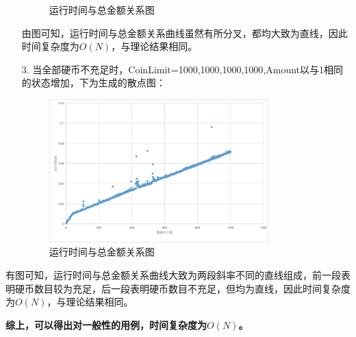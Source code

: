 \documentclass[UTF8]{ctexart}
\begin{document}
\begin{itemize}
\begin{figure}[H]
                \caption{运行时间与总金额关系图}
                \label{fig2}
                \end{figure}\par
由图可知，运行时间与总金额关系曲线虽然有所分叉，都均大致为直线，因此时间复杂度为$O(N)$，与理论结果相同。
    \item [3.]当全部硬币不充足时，CoinLimit={1000,1000,1000,1000},Amount以与1相同的状态增加，下为生成的散点图：
    \begin{figure}[H]
                \centering %
                \includegraphics[width=0.8\textwidth]{Fig3.png}
                \caption{运行时间与总金额关系图}
                \label{fig3}
                \end{figure}\par
\end{itemize}
有图可知，运行时间与总金额关系曲线大致为两段斜率不同的直线组成，前一段表明硬币数目较为充足，后一段表明硬币数目不充足，但均为直线，因此时间复杂度为$O(N)$，与理论结果相同。\par
    \textbf{综上，可以得出对一般性的用例，时间复杂度为$O(N)$。}
\end{document}
